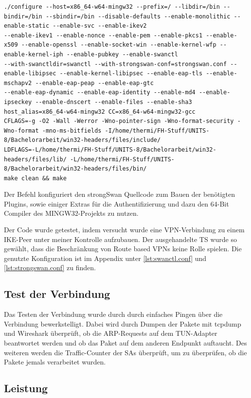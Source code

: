 \begin{lstlisting}[caption=./configure und make]
./configure --host=x86_64-w64-mingw32 --prefix=/ --libdir=/bin --bindir=/bin --sbindir=/bin --disable-defaults --enable-monolithic --enable-static --enable-svc --enable-ikev2 
--enable-ikev1 --enable-nonce --enable-pem --enable-pkcs1 --enable-x509 --enable-openssl --enable-socket-win --enable-kernel-wfp --enable-kernel-iph --enable-pubkey --enable-swanctl 
--with-swanctldir=swanctl --with-strongswan-conf=strongswan.conf --enable-libipsec --enable-kernel-libipsec --enable-eap-tls --enable-mschapv2 --enable-eap-peap --enable-eap-gtc 
--enable-eap-dynamic --enable-eap-identity --enable-md4 --enable-ipseckey --enable-dnscert --enable-files --enable-sha3 host_alias=x86_64-w64-mingw32 CC=x86_64-w64-mingw32-gcc 
CFLAGS=-g -O2 -Wall -Werror -Wno-pointer-sign -Wno-format-security -Wno-format -mno-ms-bitfields -I/home/thermi/FH-Stuff/UNITS-8/Bachelorarbeit/win32-headers/files/include/ 
LDFLAGS=-L/home/thermi/FH-Stuff/UNITS-8/Bachelorarbeit/win32-headers/files/lib/ -L/home/thermi/FH-Stuff/UNITS-8/Bachelorarbeit/win32-headers/files/bin/
make clean && make
\end{lstlisting}

Der Befehl konfiguriert den strongSwan Quellcode zum Bauen der benötigten Plugins, sowie einiger
Extras für die Authentifizierung und dazu den 64-Bit Compiler des MINGW32-Projekts zu nutzen.

Der Code wurde getestet, indem versucht wurde eine VPN-Verbindung zu einem \ac{IKE}-Peer
unter meiner Kontrolle aufzubauen. Der ausgehandelte \ac{TS} wurde so gewählt, dass
die Beschränkung von Route based VPNs keine Rolle spielen.
Die genutzte Konfiguration ist im Appendix unter \autoref{lst:swanctl.conf}
und \autoref{lst:strongswan.conf} zu finden.

\subsection{Test der Verbindung}
Das Testen der Verbindung wurde durch durch einfaches Pingen über die Verbindung bewerkstelligt.
Dabei wird durch Dumpen der Pakete mit tcpdump und Wireshark überprüft, ob die
\ac{ARP}-Requests auf dem TUN-Adapter beantwortet werden und ob das Paket auf dem
anderen Endpunkt auftaucht. Des weiteren werden die Traffic-Counter der \acp{SA} überprüft,
um zu überprüfen, ob die Pakete jemals verarbeitet wurden.

\subsection{Leistung}


